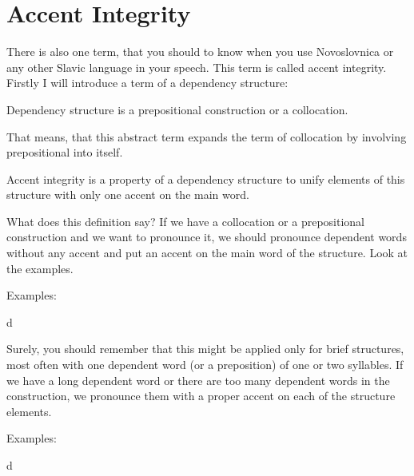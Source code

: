 \section{Accent Integrity}

There is also one term, that you should to know when you use Novoslovnica or any other Slavic language in your speech. This term is called accent integrity. Firstly I will introduce a term of a dependency structure:

Dependency structure is a prepositional construction or a collocation.

That means, that this abstract term expands the term of collocation by involving prepositional into itself. 

Accent integrity is a property of a dependency structure to unify elements of this structure with only one accent on the main word.

What does this definition say? If we have a collocation or a prepositional construction and we want to pronounce it, we should pronounce dependent words without any accent and put an accent on the main word of the structure. Look at the examples.

Examples:


d

Surely, you should remember that this might be applied only for brief structures, most often with one dependent word (or a preposition) of one or two syllables. If we have a long dependent word or there are too many dependent words in the construction, we pronounce them with a proper accent on each of the structure elements.

Examples:


d

